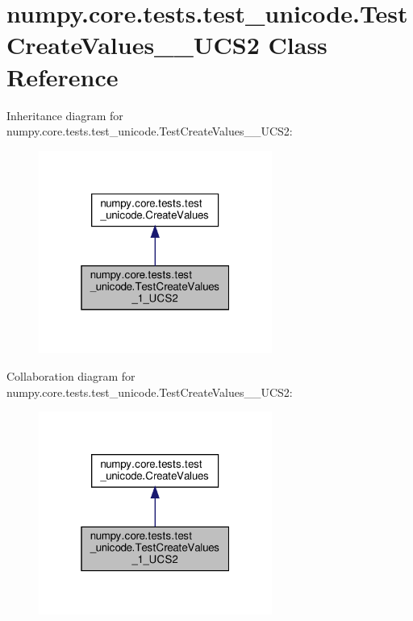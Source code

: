 \hypertarget{classnumpy_1_1core_1_1tests_1_1test__unicode_1_1TestCreateValues__1__UCS2}{}\section{numpy.\+core.\+tests.\+test\+\_\+unicode.\+Test\+Create\+Values\+\_\+\_\+\+U\+C\+S2 Class Reference}
\label{classnumpy_1_1core_1_1tests_1_1test__unicode_1_1TestCreateValues__1__UCS2}


Inheritance diagram for numpy.\+core.\+tests.\+test\+\_\+unicode.\+Test\+Create\+Values\+\_\+\_\+\+U\+C\+S2\+:
\nopagebreak
\begin{figure}[H]
\begin{center}
\leavevmode
\includegraphics[width=217pt]{classnumpy_1_1core_1_1tests_1_1test__unicode_1_1TestCreateValues__1__UCS2__inherit__graph}
\end{center}
\end{figure}


Collaboration diagram for numpy.\+core.\+tests.\+test\+\_\+unicode.\+Test\+Create\+Values\+\_\+\_\+\+U\+C\+S2\+:
\nopagebreak
\begin{figure}[H]
\begin{center}
\leavevmode
\includegraphics[width=217pt]{classnumpy_1_1core_1_1tests_1_1test__unicode_1_1TestCreateValues__1__UCS2__coll__graph}
\end{center}
\end{figure}
